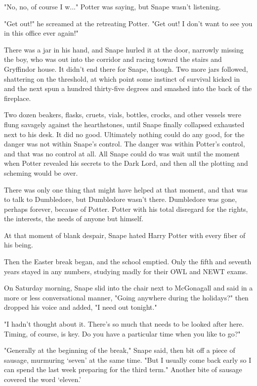 \documentclass[a4paper,11pt]{article}
\begin{document}
"No, no, of course I w..." Potter was saying, but Snape wasn't listening.

"Get out!" he screamed at the retreating Potter. "Get out! I don't want to see you in this office ever again!"

There was a jar in his hand, and Snape hurled it at the door, narrowly missing the boy, who was out into the corridor and racing toward the stairs and Gryffindor house. It didn't end there for Snape, though. Two more jars followed, shattering on the threshold, at which point some instinct of survival kicked in and the next spun a hundred thirty-five degrees and smashed into the back of the fireplace.

Two dozen beakers, flasks, cruets, vials, bottles, crocks, and other vessels were flung savagely against the hearthstones, until Snape finally collapsed exhausted next to his desk. It did no good. Ultimately nothing could do any good, for the danger was not within Snape's control. The danger was within Potter's control, and that was no control at all. All Snape could do was wait until the moment when Potter revealed his secrets to the Dark Lord, and then all the plotting and scheming would be over.

There was only one thing that might have helped at that moment, and that was to talk to Dumbledore, but Dumbledore wasn't there. Dumbledore was gone, perhaps forever, because of Potter. Potter with his total disregard for the rights, the interests, the needs of anyone but himself.

At that moment of blank despair, Snape hated Harry Potter with every fiber of his being.

Then the Easter break began, and the school emptied. Only the fifth and seventh years stayed in any numbers, studying madly for their OWL and NEWT exams.

On Saturday morning, Snape slid into the chair next to McGonagall and said in a more or less conversational manner, "Going anywhere during the holidays?" then dropped his voice and added, "I need out tonight."

"I hadn't thought about it. There's so much that needs to be looked after here. Timing, of course, is key. Do you have a particular time when you like to go?"

"Generally at the beginning of the break," Snape said, then bit off a piece of sausage, murmuring `seven' at the same time. "But I usually come back early so I can spend the last week preparing for the third term." Another bite of sausage covered the word `eleven.'
\end{document}
